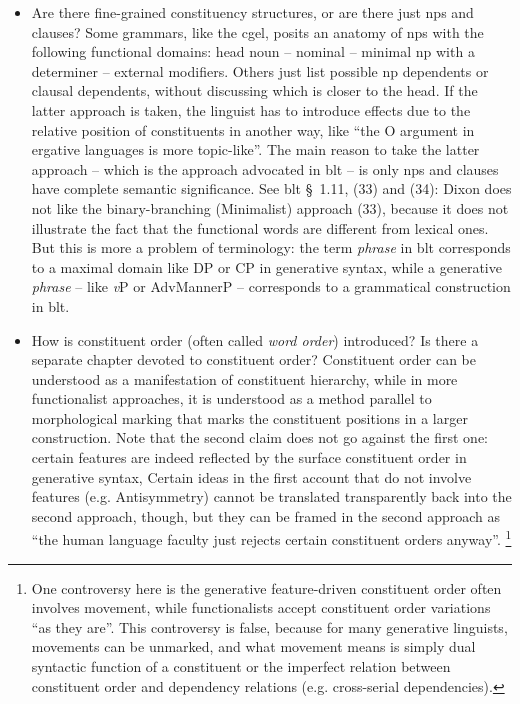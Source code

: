 \documentclass{article}
\newcommand*{\citesec}[1]{\S~{#1}}
\newcommand*{\term}[1]{\emph{#1}}
\begin{document}
\begin{itemize}
    \item Are there fine-grained constituency structures, or are there just \acl{np}s and clauses?
    Some grammars, like the \ac{cgel}, 
    posits an anatomy of \ac{np}s with the following functional domains:
    head noun -- nominal -- minimal \ac{np} with a determiner -- external modifiers.
    Others just list possible \ac{np} dependents or clausal dependents,
    without discussing which is closer to the head. 
    If the latter approach is taken,
    the linguist has to introduce effects due to the relative position of constituents in another way,
    like ``the O argument in ergative languages is more topic-like''.
    The main reason to take the latter approach -- which is the approach advocated in \ac{blt} --
    is only \ac{np}s and clauses have complete semantic significance.
    See \ac{blt} \citesec{1.11}, (33) and (34):
    Dixon does not like the binary-branching (Minimalist) approach (33),
    because it does not illustrate the fact that the functional words are different from lexical ones. 
    But this is more a problem of terminology:
    the term \term{phrase} in \ac{blt} corresponds to a maximal domain like DP or CP in generative syntax,
    while a generative \term{phrase} -- like \term{v}P or AdvMannerP -- 
    corresponds to a grammatical construction in \ac{blt}.
    
    \item How is constituent order (often called \term{word order}) introduced?
    Is there a separate chapter devoted to constituent order?
    Constituent order can be understood as a manifestation of constituent hierarchy,
    while in more functionalist approaches, 
    it is understood as a method parallel to morphological marking that 
    marks the constituent positions in a larger construction.
    Note that the second claim does not go against the first one:
    certain features are indeed reflected by the surface constituent order in generative syntax,
    Certain ideas in the first account that do not involve features (e.g. Antisymmetry)
    cannot be translated transparently back into the second approach, though,
    but they can be framed in the second approach as 
    ``the human language faculty just rejects certain constituent orders anyway''.%
    \footnote{
        One controversy here is the generative feature-driven constituent order often involves movement,
        while functionalists accept constituent order variations ``as they are''.
        This controversy is false, because for many generative linguists, 
        movements can be unmarked, and what movement means is simply 
        dual syntactic function of a constituent 
        or the imperfect relation between constituent order and dependency relations
        (e.g. cross-serial dependencies).
    }


\end{itemize}
\end{document}

